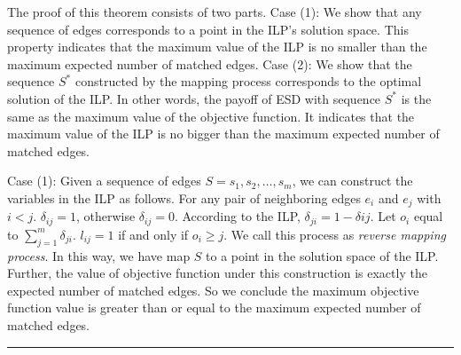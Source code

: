 \documentclass[letterpaper]{article}
\newenvironment{proof}{{Proof:}}{\hfill\rule{2mm}{2mm}}
\begin{document}
\begin{proof}
	The proof of this theorem consists of two parts. Case (1): We show that any sequence of edges corresponds to a point in the ILP's solution space. This property indicates that the maximum value of the ILP is no smaller than the maximum expected number of matched edges.
	Case (2): We show that the sequence $S^*$ constructed by the mapping process corresponds to the optimal solution of the ILP.
	In other words, the payoff of ESD with sequence $S^*$ is the same as the maximum value of the objective function. It indicates that the maximum value of the ILP is no bigger than the maximum expected number of matched edges.
	
	Case (1): Given a sequence of edges $S=s_1,s_2,\ldots,s_m$, we can construct the variables in the ILP as follows.
	For any pair of neighboring edges $e_i$ and $e_j$ with $i<j$. $\delta_{ij}=1$, otherwise $\delta_{ij}=0$.
	According to the ILP, $\delta_{ji}=1-\delta{ij}$.
	Let $o_i$ equal to $\sum_{j=1}^{m}\delta_{ji}$.
	$l_{ij}=1$ if and only if $o_i\geq j$.
	We call this process as \textit{reverse mapping process}.
	In this way, we have map $S$ to a point in the solution space of the ILP. 
	Further, the value of objective function under this construction is exactly the expected number of matched edges.
	So we conclude the maximum objective function value is greater than or equal to the maximum expected number of matched edges.
	

\end{proof}
\end{document}
